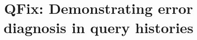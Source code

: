 


\newcommand{\papertext}[1]{#1}
\newcommand{\techreport}[1]{#1}

\newcommand{\alex}[1]{\noindent{\color{darkgreen}{Alexandra: #1}}}
\newcommand{\xlw}[1]{\noindent{\color{blue}{xl: #1}}}
\newcommand{\ewu}[1]{\noindent{\color{red}{EWu: #1}}}
\newcommand{\xxx}[1]{{\fontsize{13pt}{13pt}\selectfont\textcolor{red}{#1}}}
\newcommand{\codesize}{\fontsize{7}{8}}
\newcommand{\stitle}[1]{\vspace{0.5em}\noindent\textbf{#1}}
\newcommand{\calF}[0]{$\cal{F}$}

\newcommand{\ind}{\hspace{\algorithmicindent}}

\newcommand{\deprecate}[1]{\noindent{\color{light-gray}{#1}}}

\newcommand{\prob}{{\sc Log-Corruption}\xspace}
\newcommand{\exact}{{\sc EXACTSOL}\xspace}
\newcommand{\qfix}{{\sc SingleQueryFix}\xspace}
\newcommand{\density}{{\sc DENSITY}\xspace}


\newcommand{\milpall}{\textsc{MILP-NAIVE}\xspace}
\newcommand{\milptuple}{\textsc{MILP-COMPL}\xspace}
\newcommand{\milptuplestopearly}{\textsc{MILP-COMPL-STOPEARLY}\xspace}
\newcommand{\milpadvtuple}{\textsc{MILP-ADV-TUPLE}\xspace}
\newcommand{\milpadvall}{\textsc{MILP-ADV-ALL}\xspace}
\newcommand{\heurstic}{\textsc{HEURISTIC}\xspace}


\makeatletter
\def\maketag@@@#1{\hbox{\m@th\normalfont\normalsize#1}}
\DeclareRobustCommand*\textsubscript[1]{%
          \@textsubscript{\selectfont#1}}
        \def\@textsubscript#1{%
          {\m@th\ensuremath{_{\mbox{\fontsize\sf@size\z@#1}}}}}
\makeatother

\newcommand{\sysname}{\textsc{QueryFix}}
\newcommand{\sys}{QFix\xspace}
\newcommand{\naive}{\sysname\textsubscript{basic}\xspace}
\newcommand{\tslice}{\sysname\textsubscript{ts}\xspace}
\newcommand{\qslice}{\sysname\textsubscript{qs}\xspace}
\newcommand{\aslice}{\sysname\textsubscript{as}\xspace}
\newcommand{\incremental}{\sysname\textsubscript{inc}\xspace}



\title{{\sys}: Demonstrating error diagnosis in query histories}

